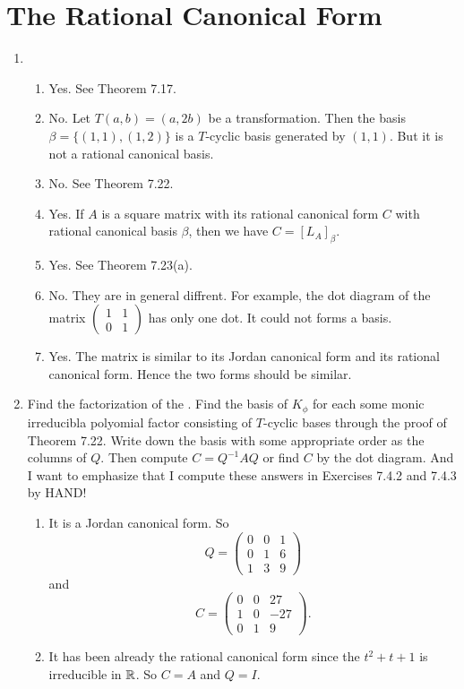 \section{The Rational Canonical Form}
\begin{enumerate}
\item \begin{enumerate}
\item Yes. See Theorem 7.17.
\item No. Let $T(a,b)=(a,2b)$ be a transformation. Then the basis $\beta=\{(1,1),(1,2)\}$ is a $T$-cyclic basis generated by $(1,1)$. But it is not a rational canonical basis.
\item No. See Theorem 7.22.
\item Yes. If $A$ is a square matrix with its rational canonical form $C$ with rational canonical basis $\beta$, then we have $C=[L_A]_{\beta}$.
\item Yes. See Theorem 7.23(a).
\item No. They are in general diffrent. For example, the dot diagram of the matrix $\begin{pmatrix}1&1\\0&1\end{pmatrix}$ has only one dot. It could not forms a basis.
\item Yes. The matrix is similar to its Jordan canonical form and its rational canonical form. Hence the two forms should be similar.
\end{enumerate}
\item Find the factorization of the \charpoly{}. Find the basis of $K_{\phi}$ for each some monic irreducibla polyomial factor consisting of $T$-cyclic bases through the proof of Theorem 7.22. Write down the basis with some appropriate order as the columns of $Q$. Then compute $C=Q^{-1}AQ$ or find $C$ by the dot diagram. And I want to emphasize that I compute these answers in Exercises 7.4.2 and 7.4.3 by HAND! 
\begin{enumerate}
\item It is a Jordan canonical form. So 
\[Q=\begin{pmatrix}0&0&1\\0&1&6\\1&3&9\end{pmatrix}\]
and 
\[C=\begin{pmatrix}0&0&27\\1&0&-27\\0&1&9\end{pmatrix}.\]
\item It has been already the rational canonical form since the \charpoly{} $t^2+t+1$ is irreducible in $\mathbb{R}$. So $C=A$ and $Q=I$.

\end{enumerate}
\end{enumerate}
